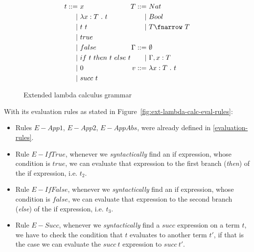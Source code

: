 \begin{figure}[H]
       \[
              \begin{aligned}
                     t ::= & \ x                        \\
                     |     & \  \lambda x:T\ .\ t       \\
                     |     & \  t\ t                    \\
                     |     & \  true                    \\
                     |     & \  false                   \\
                     |     & \  if\ t\ then\ t\ else\ t \\
                     |     & \  0                       \\
                     |     & \  succ\ t
              \end{aligned}
              \begin{aligned}
                     T ::=      & \ Nat                \\
                     |          & \ Bool               \\
                     |          & \ T \fnarrow\ T      \\
                     \\
                     \Gamma ::= & \ \emptyset          \\
                     |          & \ \Gamma, x:T        \\
                     v ::=      & \  \lambda x:T\ .\ t \\
                     \\
              \end{aligned}
       \]
       \caption{Extended lambda calculus grammar}\label{fig:ext-lambda-calc-grammar}
\end{figure}

With its evaluation rules as stated in Figure~\ref{fig:ext-lambda-calc-eval-rules}:
\begin{itemize}
       \item Rules $E-App1$, $E-App2$, $E-AppAbs$, were already defined in \autoref{evaluation-rules}.
       \item Rule $E-IfTrue$, whenever we \emph{syntactically} find an if expression, whose condition is $true$, we can evaluate that expression to the first branch (\emph{then}) of the if expression, i.e. $t_2$.
       \item Rule $E-IfFalse$, whenever we \emph{syntactically} find an if expression, whose condition is $false$, we can evaluate that expression to the second branch (\emph{else}) of the if expression, i.e. $t_3$.
       \item Rule $E-Succ$, whenever we \emph{syntactically} find a $succ$ expression on a term $t$, we have to check the condition that $t$ evaluates to another term $t'$, if that is the case we can evaluate the $succ\ t$ expression to $succ\ t'$.
\end{itemize}

